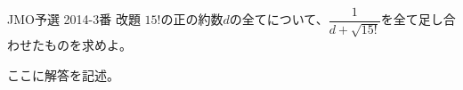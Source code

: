 \begin{thm}{8}{}{JMO予選 2014-3番 改題}
 $15!$の正の約数$d$の全てについて、$\dfrac{1}{d+\sqrt{15!}}$を全て足し合わせたものを求めよ。
\end{thm}

ここに解答を記述。